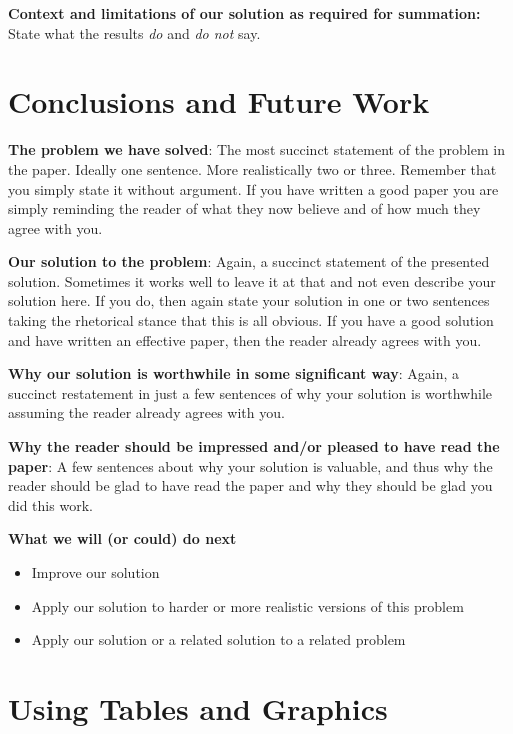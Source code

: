 \documentclass[pdf,bookmarks,colorlinks=true]{IEEEtran}
\begin{document}
\textbf{Context and limitations of our solution as required for summation:} State what the results {\em do} and {\em do not} say.

\section{Conclusions and Future Work}\label{sec:Conclusion}

\textbf{The problem we have solved}: The most succinct statement of the problem in the paper. Ideally one sentence. More realistically two or three. Remember that you simply state it without argument. If you have written a good paper you are simply reminding the reader of what they now believe and of how much they agree with you.

\textbf{Our solution to the problem}: Again, a succinct statement of the presented solution. Sometimes it works well to leave it at that and not even describe your solution here. If you do, then again state your solution in one or two sentences taking the rhetorical stance that this is all obvious. If you have a good solution and have written an effective paper, then the reader already agrees with you.

\textbf{Why our solution is worthwhile in some significant way}: Again, a succinct restatement in just a few sentences of why your solution is worthwhile assuming the reader already agrees with you.

\textbf{Why the reader should be impressed and/or pleased to have read the paper}: A few sentences about why your solution is valuable, and thus why the reader should be glad to have read the paper and why they should be glad you did this work.

\textbf{What we will (or could) do next}

\begin{itemize}
\item   Improve our solution
\item   Apply our solution to harder or more realistic versions of this problem
\item   Apply our solution or a related solution to a related problem
\end{itemize}




\appendix
\section{Using Tables and Graphics}
\end{document}
